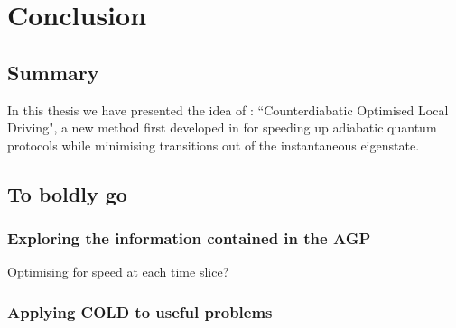 \part{Conclusion}

\chapter{Summary}\label{chap:8_Summary}

In this thesis we have presented the idea of : ``Counterdiabatic Optimised Local Driving", a new method first developed in \cite{cepaite_counterdiabatic_2023} for speeding up adiabatic quantum protocols while minimising transitions out of the instantaneous eigenstate. 

\chapter{To boldly go}\label{chap:9_Future_directions}

\section{Exploring the information contained in the AGP}

Optimising for speed at each time slice?

\section{Applying COLD to useful problems}